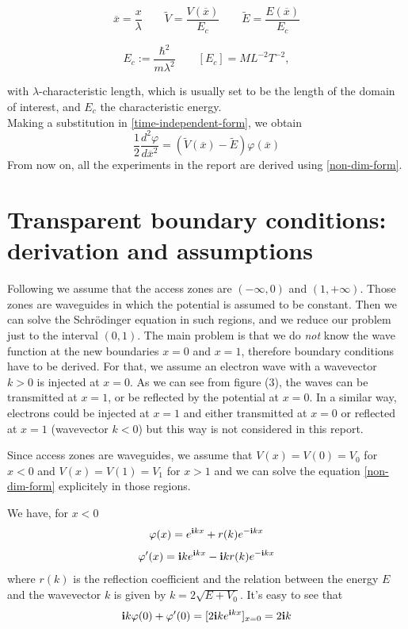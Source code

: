 \documentclass[12pt,a4paper,onecolumn]{article}
\theoremstyle{definition}
\theoremstyle{plain}
\begin{document}
\begin{equation*}
\overline{x} = \frac{x}{\lambda}\qquad \widetilde{V} = \frac{V(\overline{x})}{E_{c}}\qquad \widetilde{E} = \frac{E(\overline{x})}{E_{c}}
\end{equation*}

\begin{equation*}
    E_{c} := \frac{\hbar^2}{m \lambda^2}\qquad \left[ E_{c} \right] = ML^{-2}T^{-2},
\end{equation*}

with $\lambda$-characteristic length, which is usually set to be the length of the domain of interest, and $E_{c}$ the characteristic energy.\\
Making a substitution in \eqref{time-independent-form}, we obtain
\begin{equation}
\label{non-dim-form}
    \frac{1}{2} \frac{d^2 \varphi}{d \overline{x}^2} = ( \widetilde{V}(\overline{x})-\widetilde{E} ) \varphi(\overline{x})
\end{equation}
From now on, all the experiments in the report are derived using \eqref{non-dim-form}.


\section{Transparent boundary conditions: derivation and assumptions}

Following \cite{bc} we assume that the access zones are $(-\infty,0)$ and $(1, +\infty)$. Those zones are waveguides in which the potential is assumed to be constant. Then we can solve the Schr{\"o}dinger equation in such regions, and we reduce our problem just to the interval $(0,1)$. The main problem is that we do \emph{not} know the wave function at the new boundaries $x=0$ and $x=1$, therefore boundary conditions have to be derived. For that, we assume an electron wave with a wavevector $k>0$ is injected at $x=0$. As we can see from figure (3), the waves can be transmitted at $x=1$, or be reflected by the potential at $x=0$. In a similar way, electrons could be injected at $x=1$ and either transmitted at $x=0$ or reflected at $x=1$ (wavevector $k<0$) but this way is not considered in this report.

Since access zones are waveguides, we assume that $V(x)=V(0)=V_0$ for $x <0$ and $V(x)=V(1)=V_1$ for $x>1$ and we can solve the equation \eqref{non-dim-form} explicitely in those regions. 



We have, for $x <0$
\[ 
\varphi(x)=e^{\bold{i}kx}+r(k)e^{-\bold{i}kx} 
\]
\[
\varphi'(x)=\bold{i} k e^{\bold{i}kx} - \bold{i}k r(k)e^{-\bold{i}kx}
\]
where $r(k)$ is the reflection coefficient and the relation between the energy $E$ and the wavevector $k$ is given by $k=2 \sqrt{E+V_0}$. It's easy to see that 
\[ 
\bold{i} k \varphi(0)+\varphi'(0)=[2 \bold{i}k e^{\bold{i}k x} ]_{x=0}=2 \bold{i} k
\]
\end{document}
